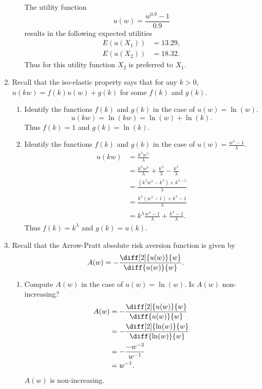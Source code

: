 \documentclass[a4paper, 12pt]{config/homework}
\begin{document}
\begin{enumerate}
\begin{enumerate}[label=(\alph*)]
The utility function
\[u(w) = \frac{w^{0.9} - 1}{0.9}\]
results in the following expected utilities
\begin{align*}
E(u(X_1)) &= 13.29,
\\E(u(X_2)) &= 18.32.
\end{align*}
Thus for this utility function \(X_2\) is preferred to \(X_1\).

\end{enumerate}
\item Recall that the iso-elastic property says that for any \(k > 0\), \(u(kw) = f(k)u(w) + g(k)\) for some \(f(k)\) and \(g(k)\).
\begin{enumerate}[label=(\alph*)]
\item Identify the functions \(f(k)\) and \(g(k)\) in the case of \(u(w)=\ln(w)\).
\[u(kw) = \ln(kw) = \ln(w) + \ln(k).\]
Thus \(f(k)=1\) and \(g(k) = \ln(k)\).

\item Identify the functions \(f(k)\) and \(g(k)\) in the case of \(u(w)=\frac{w^\lambda - 1}{\lambda}\).
\begin{align*}
u(kw) &= \frac{k^\lambda w^{\lambda}}{\lambda}
\\&= \frac{k^\lambda w^{\lambda}}{\lambda} + \frac{k^\lambda}{\lambda} - \frac{k^{\lambda}}{\lambda}
\\&= \frac{(k^\lambda w^{\lambda} - k^\lambda) + k^{\lambda - 1}}{\lambda}
\\&= \frac{k^\lambda(w^\lambda - 1) + k^\lambda - 1}{\lambda}
\\&= k^\lambda \frac{w^\lambda - 1}{\lambda} + \frac{k^\lambda - 1}{\lambda}.
\end{align*}
Thus \(f(k) = k^\lambda\) and \(g(k) = u(k).\)

\end{enumerate}
\pagebreak
\item Recall that the Arrow-Pratt absolute risk aversion function is given by
\[A(w) = -\frac{\diff[2]{u(w)}{w}}{\diff{u(w)}{w}}.\]
\begin{enumerate}[label=(\alph*)]
\item Compute \(A(w)\) in the case of \(u(w)=\ln(w)\). Is \(A(w)\) non-increasing?
\begin{align*}
A(w) &= -\frac{\diff[2]{u(w)}{w}}{\diff{u(w)}{w}}
\\&= -\frac{\diff[2]{\ln(w)}{w}}{\diff{\ln(w)}{w}}
\\&= -\frac{-w^{-2}}{w^{-1}}
\\&= w^{-1}.
\end{align*}
\(A(w)\) is non-increasing.


\end{enumerate}
\end{enumerate}
\end{document}
